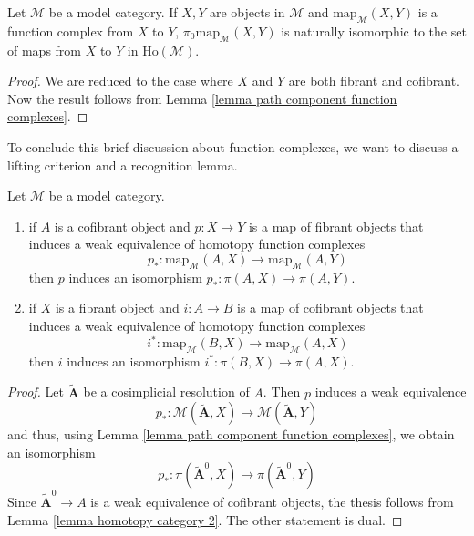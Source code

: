 \begin{prop} \label{prop path component function complexes}
Let $\mathcal M$ be a model category. If $X,Y$ are objects in $\mathcal M$ and $\mathrm{map}_{\mathcal M}(X,Y)$ is a function complex from $X$ to $Y$, $\pi_0 \mathrm{map}_{\mathcal M}(X,Y)$ is naturally isomorphic to the set of maps from $X$ to $Y$ in $\mathrm{Ho}(\mathcal M)$.
\end{prop}

\begin{proof}
We are reduced to the case where $X$ and $Y$ are both fibrant and cofibrant. Now the result follows from Lemma \ref{lemma path component function complexes}.
\end{proof}

To conclude this brief discussion about function complexes, we want to discuss a lifting criterion and a recognition lemma.

\begin{lemma} \label{lemma lifting criterion function complexes}
Let $\mathcal M$ be a model category.
\begin{enumerate}
\item if $A$ is a cofibrant object and $p \colon X \to Y$ is a map of fibrant objects that induces a weak equivalence of homotopy function complexes
\[
p_* \colon \mathrm{map}_{\mathcal M}(A,X) \to \mathrm{map}_{\mathcal M}(A,Y)
\]
then $p$ induces an isomorphism $p_* \colon \pi(A,X) \to \pi(A,Y)$.

\item if $X$ is a fibrant object and $i \colon A \to B$ is a map of cofibrant objects that induces a weak equivalence of homotopy function complexes
\[
i^* \colon \mathrm{map}_{\mathcal M}(B,X) \to \mathrm{map}_{\mathcal M}(A,X)
\]
then $i$ induces an isomorphism $i^* \colon \pi(B,X) \to \pi(A,X)$.
\end{enumerate}
\end{lemma}

\begin{proof}
Let $\widetilde{\mathbf A}$ be a cosimplicial resolution of $A$. Then $p$ induces a weak equivalence
\[
p_* \colon \mathcal M (\widetilde{\mathbf A}, X) \to \mathcal M(\widetilde{\mathbf A},Y)
\]
and thus, using Lemma \ref{lemma path component function complexes}, we obtain an isomorphism
\[
p_* \colon \pi(\widetilde{\mathbf A}^0, X) \to \pi(\widetilde{\mathbf A}^0,Y)
\]
Since $\widetilde{\mathbf A}^0 \to A$ is a weak equivalence of cofibrant objects, the thesis follows from Lemma \ref{lemma homotopy category 2}. The other statement is dual.
\end{proof}

